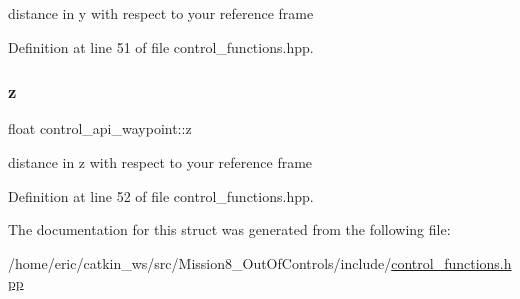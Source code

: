 distance in y with respect to your reference frame 



Definition at line 51 of file control\+\_\+functions.\+hpp.

\mbox{\label{structcontrol__api__waypoint_af77b8d62f18d1b4c1884b46147751b49}} 
\subsubsection{\texorpdfstring{z}{z}}
{\footnotesize\ttfamily float control\+\_\+api\+\_\+waypoint\+::z}



distance in z with respect to your reference frame 



Definition at line 52 of file control\+\_\+functions.\+hpp.



The documentation for this struct was generated from the following file\+:\begin{DoxyCompactItemize}
\item 
/home/eric/catkin\+\_\+ws/src/\+Mission8\+\_\+\+Out\+Of\+Controls/include/\mbox{\hyperlink{control__functions_8hpp}{control\+\_\+functions.\+hpp}}\end{DoxyCompactItemize}
